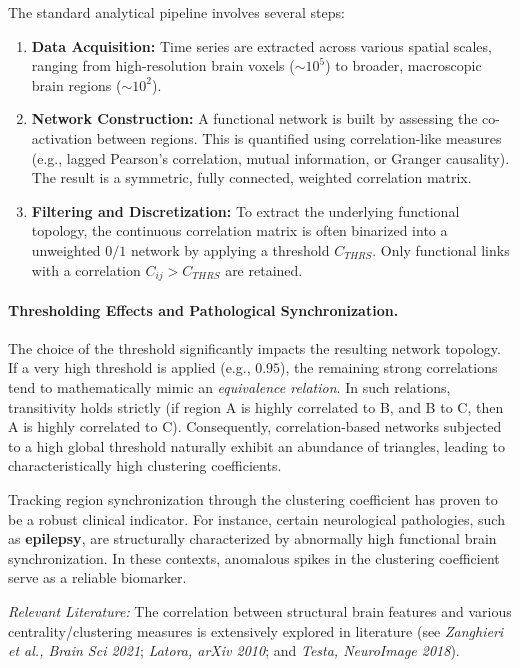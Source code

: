 The standard analytical pipeline involves several steps:
\begin{enumerate}
    \item \textbf{Data Acquisition:} Time series are extracted across various spatial scales, ranging from high-resolution brain voxels ($\sim 10^5$) to broader, macroscopic brain regions ($\sim 10^2$).
    \item \textbf{Network Construction:} A functional network is built by assessing the co-activation between regions. This is quantified using correlation-like measures (e.g., lagged Pearson's correlation, mutual information, or Granger causality). The result is a symmetric, fully connected, weighted correlation matrix.
    \item \textbf{Filtering and Discretization:} To extract the underlying functional topology, the continuous correlation matrix is often binarized into a unweighted $0/1$ network by applying a threshold $C_{THRS}$. Only functional links with a correlation $C_{ij} > C_{THRS}$ are retained.
\end{enumerate}

\paragraph{Thresholding Effects and Pathological Synchronization.}
The choice of the threshold significantly impacts the resulting network topology. If a very high threshold is applied (e.g., $0.95$), the remaining strong correlations tend to mathematically mimic an \textit{equivalence relation}. In such relations, transitivity holds strictly (if region A is highly correlated to B, and B to C, then A is highly correlated to C). Consequently, correlation-based networks subjected to a high global threshold naturally exhibit an abundance of triangles, leading to characteristically high clustering coefficients.

Tracking region synchronization through the clustering coefficient has proven to be a robust clinical indicator. For instance, certain neurological pathologies, such as \textbf{epilepsy}, are structurally characterized by abnormally high functional brain synchronization. In these contexts, anomalous spikes in the clustering coefficient serve as a reliable biomarker.

\textit{Relevant Literature:} The correlation between structural brain features and various centrality/clustering measures is extensively explored in literature (see \textit{Zanghieri et al., Brain Sci 2021}; \textit{Latora, arXiv 2010}; and \textit{Testa, NeuroImage 2018}).

